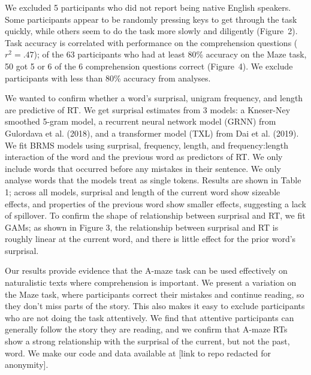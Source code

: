 \documentclass[11pt,a4paper]{article}
\begin{document}
 We excluded 5 participants who did not report being native English speakers. Some participants appear to be randomly pressing keys to get through the task quickly, while others seem to do the task more slowly and diligently (Figure~2). Task accuracy is correlated with performance on the comprehension questions ($r^2=.47$); of the 63 participants who had at least 80\% accuracy on the Maze task, 50 got 5 or 6 of the 6 comprehension questions correct (Figure~4). We exclude participants with less than 80\% accuracy from analyses. 

We wanted to confirm whether a word's surprisal, unigram frequency, and length are predictive of RT. We get surprisal estimates from  3 models: a Kneser-Ney smoothed 5-gram model, a recurrent neural network model (GRNN) from Gulordava et al. (2018), and a transformer model (TXL) from Dai et al. (2019). We fit BRMS models using surprisal, frequency, length, and frequency:length interaction of the word and the previous word as predictors of RT.  We only include words that occurred before any mistakes in their sentence. We only analyse words that the models treat as single tokens.  Results are shown in Table 1; across all models, surprisal and length of the current word show sizeable effects, and properties of the previous word show smaller effects, suggesting a lack of spillover. To confirm the shape of relationship between surprisal and RT, we fit GAMs; as shown in Figure 3, the relationship between surprisal and RT is roughly linear at the current word, and there is little effect for the prior word's surprisal.  %

Our results provide evidence that the A-maze task can be used effectively on naturalistic texts where comprehension is important. We present a variation on the Maze task, where participants correct their mistakes and continue reading, so they don't miss parts of the story. This also makes it easy to exclude participants who are not doing the task attentively. We find that attentive participants can generally follow the story they are reading, and we confirm that A-maze RTs show a strong relationship with the surprisal of the current, but not the past, word. We make our code and data available at [link to repo redacted for anonymity]. 
\end{document}
